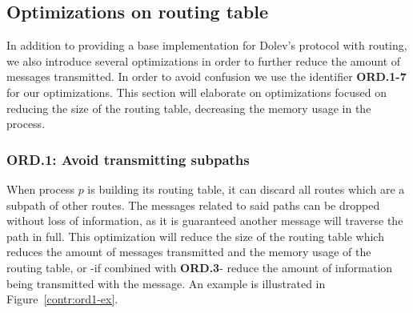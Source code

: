 \subsection{Optimizations on routing table}
In addition to providing a base implementation for Dolev's protocol with routing, we also introduce several optimizations in order to further reduce the amount of messages transmitted. In order to avoid confusion we use the identifier \textbf{ORD.1-7} for our optimizations. This section will elaborate on optimizations focused on reducing the size of the routing table, decreasing the memory usage in the process.

\subsubsection{ORD.1: Avoid transmitting subpaths}
When process $p$ is building its routing table, it can discard all routes which are a subpath of other routes. The messages related to said paths can be dropped without loss of information, as it is guaranteed another message will traverse the path in full. This optimization will reduce the size of the routing table which reduces the amount of messages transmitted and the memory usage of the routing table, or -if combined with \textbf{ORD.3}- reduce the amount of information being transmitted with the message. An example is illustrated in Figure~\ref{contr:ord1-ex}.

